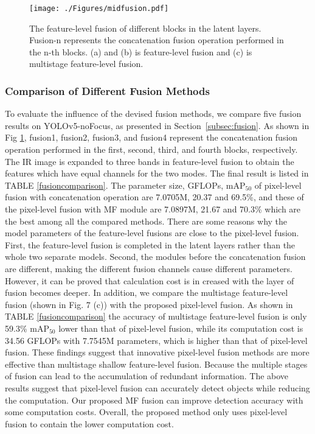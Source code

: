 \begin{figure}[htpb]
	\centering
\texttt{[image: ./Figures/midfusion.pdf]}
	\centering
	\caption{The feature-level fusion of different blocks in the latent layers. Fusion-n represents the concatenation fusion operation performed in the n-th blocks. (a) and (b) is feature-level fusion and (c) is multistage feature-level fusion.}
	\vspace{-0.1in}
	\label{midfusion}
\end{figure}




\subsubsection{\textbf{Comparison of Different Fusion Methods}}
To evaluate the influence of the devised fusion methods, we compare five fusion results on YOLOv5-noFocus, as presented in Section~\ref{subsec:fusion}. As shown in Fig \ref{midfusion}, fusion1, fusion2, fusion3, and fusion4 represent the concatenation fusion operation performed in the first, second, third, and fourth blocks, respectively. The IR image is expanded to three bands in feature-level fusion to obtain the features which have equal channels for the two modes. The final result is listed in TABLE \ref{fusioncomparison}. The parameter size, GFLOPs, $\text{mA}{{\text{P}}_{\text{50}}}$ of pixel-level fusion with concatenation operation are 7.0705M, 20.37 and 69.5\%,  and these of the pixel-level fusion with MF module are 7.0897M, 21.67 and 70.3\% which are the best among all the compared methods. There are some reasons why the model parameters of the feature-level fusions are close to the pixel-level fusion. First, the feature-level fusion is completed in the latent layers rather than the whole two separate models. Second, the modules before the concatenation fusion are different, making the different fusion channels cause different parameters. However, it can be proved that calculation cost is in creased with the layer of fusion becomes deeper. In addition, we compare the multistage feature-level fusion (shown in Fig. 7 (c)) with the proposed pixel-level fusion. As shown in TABLE \ref{fusioncomparison} the accuracy of multistage feature-level fusion is only 59.3\% $\text{mA}{{\text{P}}_{\text{50}}}$ lower than that of pixel-level fusion, while its computation cost is 34.56 GFLOPs with 7.7545M parameters, which is higher than that of pixel-level fusion. These findings suggest that innovative pixel-level fusion methods are more effective than multistage shallow feature-level fusion. Because the multiple stages of fusion can lead to the accumulation of redundant information. The above results suggest that pixel-level fusion can accurately detect objects while reducing the computation. Our proposed MF fusion can improve detection accuracy with some computation costs. Overall, the proposed method only uses pixel-level fusion to contain the lower computation cost.



